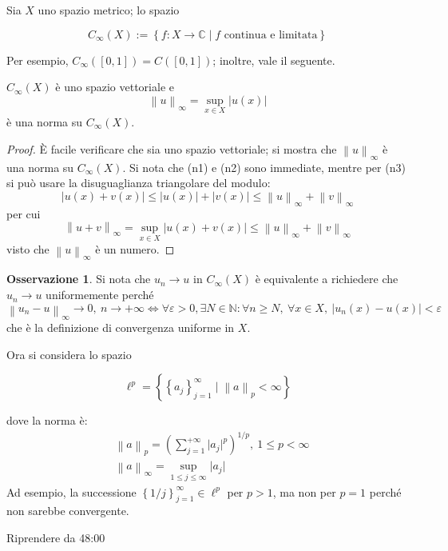 \documentclass[11pt, a4paper]{scrartcl}
\theoremstyle{definition}
\numberwithin{esempio}{section}
\theoremstyle{definition}
\newtheorem{obs}{Osservazione}
\numberwithin{obs}{section}
\numberwithin{nota}{section}
\newenvironment{boxenv}[1][]{
    \begin{eqbox}[#1]
    }{
   \end{eqbox}
}
\numberwithin{equation}{subsection}
\begin{document}
Sia $X$ uno spazio metrico; lo spazio 
\begin{boxenv}[]
\begin{equation}
	C_\infty (X) := \left\{ f: X \to \mathbb{C}  \mid f \text{ continua e limitata} \right\} 
\end{equation}
\end{boxenv}
\noindent Per esempio, $C_\infty\left(\left[ 0,1 \right] \right) = C \left(\left[ 0,1 \right] \right) $; inoltre, vale il seguente.
\begin{teorema}
	{}{}
	$C_\infty(X)$ \`e uno spazio vettoriale e 
	\begin{equation}
		\left\lVert  u\right\rVert 	_\infty = \sup _{x \in X} \lvert u(x) \rvert 
	\end{equation}
	\`e una norma su $C_\infty(X)$.
	\begin{proof}
		\`E facile verificare che sia uno spazio vettoriale; si mostra che $\left\lVert u \right\rVert _\infty$ \`e una norma su $C_\infty(X)$.
		Si nota che (n1) e (n2) sono immediate, mentre per (n3) si pu\`o usare la disuguaglianza triangolare del modulo:
\[
|u(x) + v(x)|\le |u(x)| + |v(x)| \le \left\lVert u \right\rVert _\infty + \left\lVert v \right\rVert _\infty
\] 
per cui
\[
\left\lVert u + v \right\rVert _\infty = \sup_{ x \in X} \lvert u(x) +v (x) \rvert \le \left\lVert u \right\rVert _\infty + \left\lVert v \right\rVert _\infty 
\] 
visto che $\left\lVert u \right\rVert _\infty$ \`e un numero.
	\end{proof}
\end{teorema}
\begin{obs}
	Si nota che $u_n \to u$ in $C_\infty(X)$ \`e equivalente a richiedere che $u_n\to u$ uniformemente perch\'e 
	\[
	\left\lVert u_n - u  \right\rVert _\infty \to 0 , \ n\to +\infty \iff\forall \varepsilon >0, \exists N \in \mathbb{N} : \forall n\ge N, \ \forall x \in X, \ \lvert u_n(x) - u(x) \rvert < \varepsilon 
	\] 
	che \`e la definizione di convergenza uniforme in $X$.
\end{obs}
Ora si considera lo spazio
\begin{boxenv}[]
\begin{equation}
	\ell ^p = \left\{ \left\{ a_j \right\}_{j=1} ^\infty \mid \left\lVert a \right\rVert _p < \infty  \right\} 
\end{equation}
\end{boxenv}
dove la norma \`e:
\begin{equation}
	\begin{split}
		&\left\lVert a \right\rVert _p = \left(\sum_{j=1}^{+\infty} \lvert a_j \rvert ^p\right) ^{1/p}, \ 1\le p< \infty\\
		&\left\lVert a \right\rVert _\infty = \sup_{1\le j\le \infty} \lvert a_j \rvert 
	\end{split}
\end{equation}
Ad esempio, la successione $\left\{ 1 / j \right\} _{j=1} ^{\infty} \in \ell ^p$ per $p>1$, ma non per $p=1$ perch\'e non sarebbe convergente.
\begin{center}
	Riprendere da 48:00
\end{center}
\end{document}
